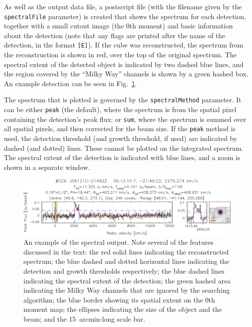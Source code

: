 


As well as the output data file, a postscript file (with the filename
given by the \texttt{spectralFile} parameter) is created that shows
the spectrum for each detection, together with a small cutout image
(the 0th moment) and basic information about the detection (note that
any flags are printed after the name of the detection, in the format
\texttt{[E]}). If the cube was reconstructed, the spectrum from the
reconstruction is shown in red, over the top of the original
spectrum. The spectral extent of the detected object is indicated by
two dashed blue lines, and the region covered by the ``Milky Way''
channels is shown by a green hashed box. An example detection can be
seen in Fig.~\ref{fig-spect}.

The spectrum that is plotted is governed by the
\texttt{spectralMethod} parameter. It can be either \texttt{peak} (the
default), where the spectrum is from the spatial pixel containing the
detection's peak flux; or \texttt{sum}, where the spectrum is summed
over all spatial pixels, and then corrected for the beam size. If the
\texttt{peak} method is used, the detection threshold (and growth
threshold, if used) are indicated by dashed (and dotted) lines. These
cannot be plotted on the integrated spectrum. The spectral extent of
the detection is indicated with blue lines, and a zoom is shown in a
separate window.

\begin{figure}[t]
  \begin{center}
    \includegraphics[width=\textwidth]{example_spectrum}
  \end{center}
  \caption{\footnotesize An example of the spectral output. Note
    several of the features discussed in the text: the red solid lines
    indicating the reconstructed spectrum; the blue dashed and dotted
    horizontal lines indicating the detection and growth thresholds
    respectively; the blue dashed lines indicating the spectral extent
    of the detection; the green hashed area indicating the Milky Way
    channels that are ignored by the searching algorithm; the blue
    border showing its spatial extent on the 0th moment map; the
    ellipses indicating the size of the object and the beam; and the
    15~arcmin-long scale bar.}
  \label{fig-spect}
\end{figure}

